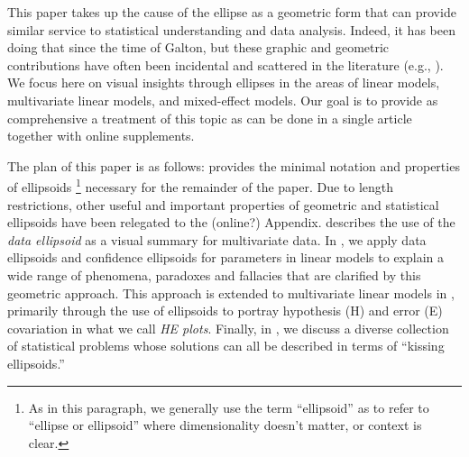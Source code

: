 This paper  takes up  the cause  of the  ellipse as  a geometric  form that  can
provide similar service to statistical understanding and data analysis.  Indeed,
it has been doing that since the time of Galton, but these graphic and geometric
contributions have often  been incidental and  scattered in the  literature
(e.g., \citet{Bryant:1984,CampbellAtchley:81,SavilleWood:1991,Wickens:1995}). 
We focus here on visual  insights through ellipses in  the areas of linear  models,
multivariate linear models, and mixed-effect models.  Our goal is to provide as
comprehensive a treatment of this topic as can be done in a single article
together with online supplements.

The plan of this paper is as follows:  provides the minimal notation and
properties of ellipsoids%
\footnote{As in this paragraph,    
we generally use the term ``ellipsoid'' as to refer to ``ellipse or ellipsoid'' where dimensionality doesn't matter, or context is clear.}
 necessary for the remainder of the paper.  Due to length restrictions,
other useful and important properties of geometric and statistical ellipsoids have been relegated
to the (online?) Appendix.  describes the use of the \emph{data ellipsoid}
as a visual summary for multivariate data. In , we apply data ellipsoids and
confidence ellipsoids for parameters in linear models to explain a wide range of phenomena, paradoxes and fallacies
that are clarified by this geometric approach.    
This approach is extended to multivariate linear models in , primarily through the use
of ellipsoids to portray hypothesis (H) and error (E) covariation in what we call \emph{HE plots}.
Finally, in , we discuss a diverse collection of statistical problems whose solutions
can all be described in terms of ``kissing ellipsoids.''
                                                                                                                    